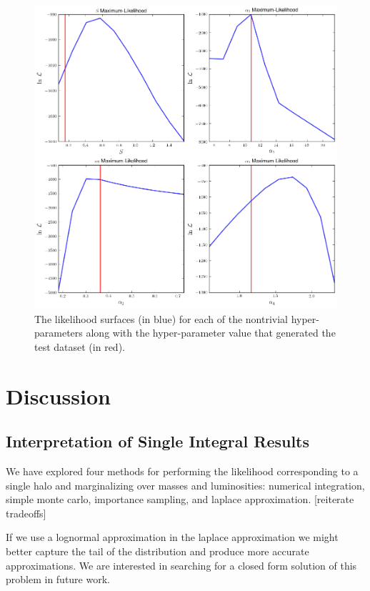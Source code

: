 \documentclass[\docopts]{\docclass}
\begin{document}
\begin{figure}[!h]
\centering
\includegraphics[width=0.9\columnwidth]{multi_post.png}
\caption{
The likelihood surfaces (in blue) for each of the nontrivial hyper-parameters along with the hyper-parameter value that generated the test dataset (in red). 
\label{fig:multi_post}}
\end{figure}


\section{Discussion}
\label{sec:discussion}

\subsection{Interpretation of Single Integral Results}
\label{subsec:interp}
We have explored four methods for performing the likelihood corresponding to a single halo and marginalizing over masses and luminosities: numerical integration, simple monte carlo, importance sampling, and laplace approximation. [reiterate tradeoffs]

If we use a lognormal approximation in the laplace approximation we might better capture the tail of the distribution and produce more accurate approximations. We are interested in searching for a closed form solution of this problem in future work. 
\end{document}
